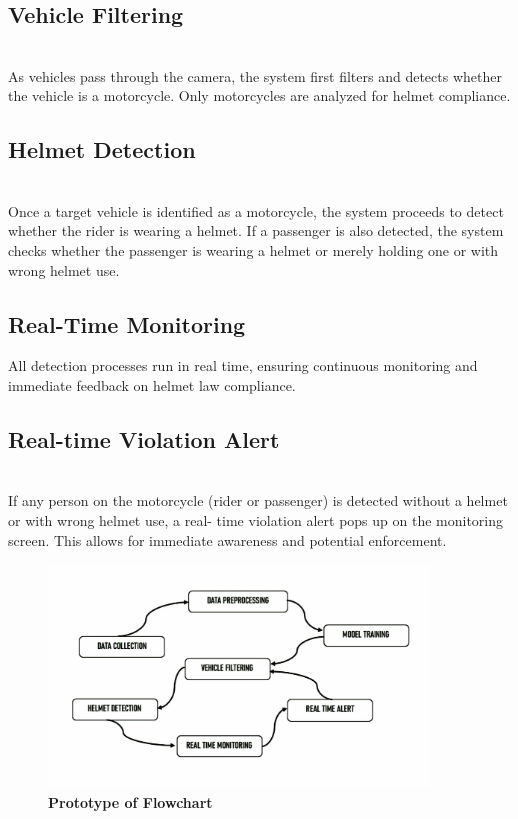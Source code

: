 \begin{refsection}
\subsection {Vehicle Filtering} \\
As vehicles pass through the camera, the system first filters and detects whether the vehicle is a motorcycle. Only motorcycles are analyzed for helmet compliance.

\subsection {Helmet Detection} \\
Once a target vehicle is identified as a motorcycle, the system proceeds to detect whether the rider is wearing a helmet. If a passenger is also detected, the system checks whether the passenger is wearing a helmet or merely holding one or with wrong helmet use.

\subsection{Real-Time Monitoring}
All detection processes run in real time, ensuring continuous monitoring and immediate feedback on helmet law compliance.

\subsection {Real-time Violation Alert} \\
If any person on the motorcycle (rider or passenger) is detected without a helmet or with wrong helmet use, a real- time violation alert pops up on the monitoring screen. This allows for immediate awareness and potential enforcement.


\begin{figure}[H]
    \centering
    \includegraphics[width=0.9\textwidth]{figures/Fig 5.jpg}
    \caption{\textbf{Prototype of Flowchart}}
    \label{figures/Fig 5.jpg}
\end{figure}


\end{refsection}
